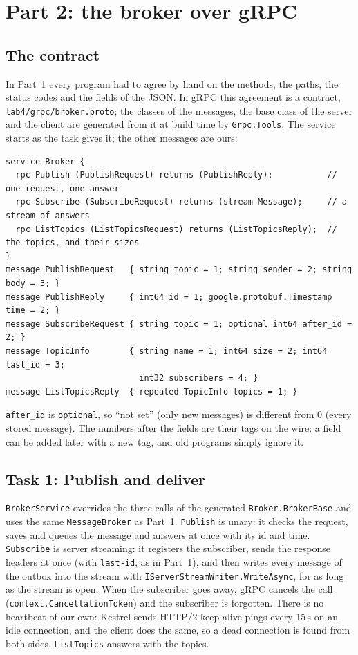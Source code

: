 \documentclass[11pt,a4paper]{article}
\newcommand{\code}[1]{{\frenchspacing\texttt{#1}}}
\begin{document}
\section{Part 2: the broker over gRPC}

\subsection{The contract}

In Part~1 every program had to agree by hand on the methods, the paths, the status codes and the
fields of the JSON. In gRPC this agreement is a contract, \code{lab4/grpc/broker.proto}; the classes
of the messages, the base class of the server and the client are generated from it at build time by
\code{Grpc.Tools}. The service starts as the task gives it; the other messages are ours:

\begin{lstlisting}[language=Proto]
service Broker {
  rpc Publish (PublishRequest) returns (PublishReply);           // one request, one answer
  rpc Subscribe (SubscribeRequest) returns (stream Message);     // a stream of answers
  rpc ListTopics (ListTopicsRequest) returns (ListTopicsReply);  // the topics, and their sizes
}
message PublishRequest   { string topic = 1; string sender = 2; string body = 3; }
message PublishReply     { int64 id = 1; google.protobuf.Timestamp time = 2; }
message SubscribeRequest { string topic = 1; optional int64 after_id = 2; }
message TopicInfo        { string name = 1; int64 size = 2; int64 last_id = 3;
                           int32 subscribers = 4; }
message ListTopicsReply  { repeated TopicInfo topics = 1; }
\end{lstlisting}

\code{after\_id} is \code{optional}, so ``not set'' (only new messages) is different from 0 (every
stored message). The numbers after the fields are their tags on the wire: a field can be added later
with a new tag, and old programs simply ignore it.

\subsection{Task 1: Publish and deliver}

\code{BrokerService} overrides the three calls of the generated \code{Broker.BrokerBase} and uses the
same \code{MessageBroker} as Part~1. \code{Publish} is unary: it checks the request, saves and queues
the message and answers at once with its id and time. \code{Subscribe} is server streaming: it
registers the subscriber, sends the response headers at once (with \code{last-id}, as in Part~1), and
then writes every message of the outbox into the stream with \code{IServerStreamWriter.WriteAsync},
for as long as the stream is open. When the subscriber goes away, gRPC cancels the call
(\code{context.CancellationToken}) and the subscriber is forgotten. There is no heartbeat of our
own: Kestrel sends HTTP/2 keep-alive pings every 15\,s on an idle connection, and the client does
the same, so a dead connection is found from both sides. \code{ListTopics} answers with the topics.
\end{document}

